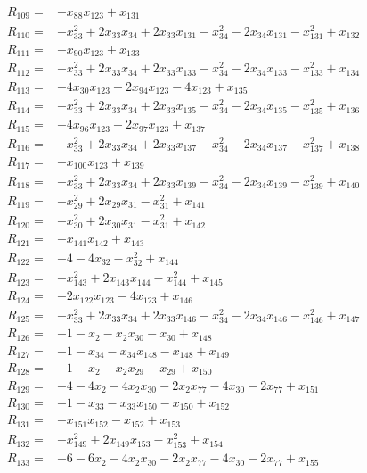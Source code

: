 \begin{align*}
R_{109}={}&-x_{88}x_{123}+x_{131}\\[3pt]
R_{110}={}&-x_{33}^{2}+2x_{33}x_{34}+2x_{33}x_{131}-x_{34}^{2}-2x_{34}x_{131}-x_{131}^{2}+x_{132}\\[3pt]
R_{111}={}&-x_{90}x_{123}+x_{133}\\[3pt]
R_{112}={}&-x_{33}^{2}+2x_{33}x_{34}+2x_{33}x_{133}-x_{34}^{2}-2x_{34}x_{133}-x_{133}^{2}+x_{134}\\[3pt]
R_{113}={}&-4x_{30}x_{123}-2x_{94}x_{123}-4x_{123}+x_{135}\\[3pt]
R_{114}={}&-x_{33}^{2}+2x_{33}x_{34}+2x_{33}x_{135}-x_{34}^{2}-2x_{34}x_{135}-x_{135}^{2}+x_{136}\\[3pt]
R_{115}={}&-4x_{96}x_{123}-2x_{97}x_{123}+x_{137}\\[3pt]
R_{116}={}&-x_{33}^{2}+2x_{33}x_{34}+2x_{33}x_{137}-x_{34}^{2}-2x_{34}x_{137}-x_{137}^{2}+x_{138}\\[3pt]
R_{117}={}&-x_{100}x_{123}+x_{139}\\[3pt]
R_{118}={}&-x_{33}^{2}+2x_{33}x_{34}+2x_{33}x_{139}-x_{34}^{2}-2x_{34}x_{139}-x_{139}^{2}+x_{140}\\[3pt]
R_{119}={}&-x_{29}^{2}+2x_{29}x_{31}-x_{31}^{2}+x_{141}\\[3pt]
R_{120}={}&-x_{30}^{2}+2x_{30}x_{31}-x_{31}^{2}+x_{142}\\[3pt]
R_{121}={}&-x_{141}x_{142}+x_{143}\\[3pt]
R_{122}={}&-4-4x_{32}-x_{32}^{2}+x_{144}\\[3pt]
R_{123}={}&-x_{143}^{2}+2x_{143}x_{144}-x_{144}^{2}+x_{145}\\[3pt]
R_{124}={}&-2x_{122}x_{123}-4x_{123}+x_{146}\\[3pt]
R_{125}={}&-x_{33}^{2}+2x_{33}x_{34}+2x_{33}x_{146}-x_{34}^{2}-2x_{34}x_{146}-x_{146}^{2}+x_{147}\\[3pt]
R_{126}={}&-1-x_{2}-x_{2}x_{30}-x_{30}+x_{148}\\[3pt]
R_{127}={}&-1-x_{34}-x_{34}x_{148}-x_{148}+x_{149}\\[3pt]
R_{128}={}&-1-x_{2}-x_{2}x_{29}-x_{29}+x_{150}\\[3pt]
R_{129}={}&-4-4x_{2}-4x_{2}x_{30}-2x_{2}x_{77}-4x_{30}-2x_{77}+x_{151}\\[3pt]
R_{130}={}&-1-x_{33}-x_{33}x_{150}-x_{150}+x_{152}\\[3pt]
R_{131}={}&-x_{151}x_{152}-x_{152}+x_{153}\\[3pt]
R_{132}={}&-x_{149}^{2}+2x_{149}x_{153}-x_{153}^{2}+x_{154}\\[3pt]
R_{133}={}&-6-6x_{2}-4x_{2}x_{30}-2x_{2}x_{77}-4x_{30}-2x_{77}+x_{155}\\[3pt]

\end{align*}
